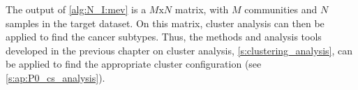 The output of \cref{alg:N_I:mev} is a $M\text{x}N$ matrix, with $M$ communities and $N$ samples in the target dataset. On this matrix, cluster analysis can then be applied to find the cancer subtypes. Thus, the methods and analysis tools developed in the previous chapter on cluster analysis, \cref{s:clustering_analysis}, can be applied to find the appropriate cluster configuration (see \cref{s:ap:P0_cs_analysis}).








